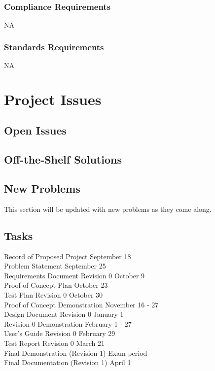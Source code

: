 \documentclass[12pt]{article}
\begin{document}
\subsubsection{Compliance Requirements}
NA
\subsubsection{Standards Requirements}
NA
\section{Project Issues}
\subsection{Open Issues} %
\subsection{Off-the-Shelf Solutions} %
\subsection{New Problems} %
This section will be updated with new problems as they come along.
\subsection{Tasks}\label{SubSec_Tasks} %
Record of Proposed Project \hfill September 18\\
Problem Statement \hfill September 25\\
Requirements Document Revision 0 \hfill October 9\\
Proof of Concept Plan \hfill October 23\\
Test Plan Revision 0 \hfill October 30\\
Proof of Concept Demonstration \hfill November 16 - 27\\
Design Document Revision 0 \hfill January 1\\
Revision 0 Demonstration \hfill February 1 - 27\\
User's Guide Revision 0 \hfill February 29\\
Test Report Revision 0 \hfill March 21\\
Final Demonstration (Revision 1) \hfill Exam period\\
Final Documentation (Revision 1) \hfill April 1
\end{document}
